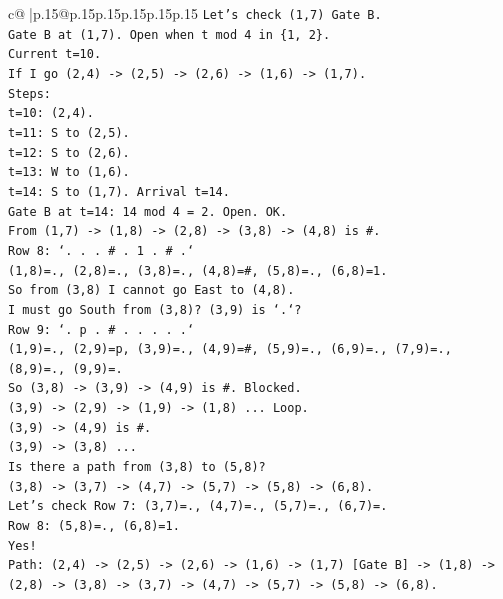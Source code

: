 \documentclass{article}
\begin{document}
{\begin{supertabular}{c@{$\;$}|p{.15\linewidth}@{}p{.15\linewidth}p{.15\linewidth}p{.15\linewidth}p{.15\linewidth}p{.15\linewidth}}
{{{\texttt{Let's check (1,7) Gate B.} \\
\texttt{Gate B at (1,7). Open when t mod 4 in \{1, 2\}.} \\
\texttt{Current t=10.} \\
\texttt{If I go (2,4) {-}> (2,5) {-}> (2,6) {-}> (1,6) {-}> (1,7).} \\
\texttt{Steps:} \\
\texttt{t=10: (2,4).} \\
\texttt{t=11: S to (2,5).} \\
\texttt{t=12: S to (2,6).} \\
\texttt{t=13: W to (1,6).} \\
\texttt{t=14: S to (1,7). Arrival t=14.} \\
\texttt{Gate B at t=14: 14 mod 4 = 2. Open. OK.} \\
\texttt{From (1,7) {-}> (1,8) {-}> (2,8) {-}> (3,8) {-}> (4,8) is \#.} \\
\texttt{Row 8: `. . . \# . 1 . \# .`} \\
\texttt{(1,8)=., (2,8)=., (3,8)=., (4,8)=\#, (5,8)=., (6,8)=1.} \\
\texttt{So from (3,8) I cannot go East to (4,8).} \\
\texttt{I must go South from (3,8)? (3,9) is `.`?} \\
\texttt{Row 9: `. p . \# . . . . .`} \\
\texttt{(1,9)=., (2,9)=p, (3,9)=., (4,9)=\#, (5,9)=., (6,9)=., (7,9)=., (8,9)=., (9,9)=.} \\
\texttt{So (3,8) {-}> (3,9) {-}> (4,9) is \#. Blocked.} \\
\texttt{(3,9) {-}> (2,9) {-}> (1,9) {-}> (1,8) ... Loop.} \\
\texttt{(3,9) {-}> (4,9) is \#.} \\
\texttt{(3,9) {-}> (3,8) ...} \\
\texttt{Is there a path from (3,8) to (5,8)?} \\
\texttt{(3,8) {-}> (3,7) {-}> (4,7) {-}> (5,7) {-}> (5,8) {-}> (6,8).} \\
\texttt{Let's check Row 7: (3,7)=., (4,7)=., (5,7)=., (6,7)=.} \\
\texttt{Row 8: (5,8)=., (6,8)=1.} \\
\texttt{Yes!} \\
\texttt{Path: (2,4) {-}> (2,5) {-}> (2,6) {-}> (1,6) {-}> (1,7) {[}Gate B{]} {-}> (1,8) {-}> (2,8) {-}> (3,8) {-}> (3,7) {-}> (4,7) {-}> (5,7) {-}> (5,8) {-}> (6,8).} \\
\\ 
}}}
\end{supertabular}}
\end{document}
